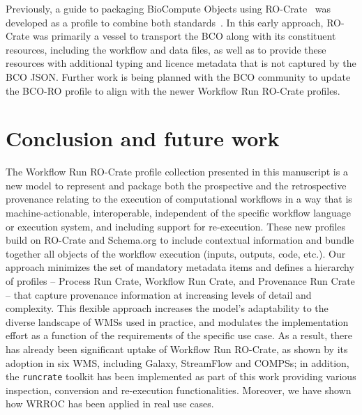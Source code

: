 \documentclass[10pt,letterpaper]{article}
\begin{document}
Previously, a guide to packaging BioCompute Objects using RO-Crate~\cite{bco-roc} was developed as a profile to combine both standards~\cite{Soiland-Reyes 2021}.
In this early approach, RO-Crate was primarily a vessel to transport the BCO along with its constituent resources, including the workflow and data files, as well as to provide these resources with additional typing and licence metadata that is not captured by the BCO JSON.
Further work is being planned with the BCO community to update the BCO-RO profile to align with the newer Workflow Run RO-Crate profiles. 

\hypertarget{conclusion}{%
\section{Conclusion and future work}\label{conclusion}}

The Workflow Run RO-Crate profile collection presented in this manuscript is a
new model to represent and package both the prospective
and the retrospective provenance relating to the execution of computational
workflows in a way that is
machine-actionable, interoperable, independent of the specific workflow language or
execution system, and including support for re-execution.
%
These new profiles build on RO-Crate and Schema.org to include contextual
information and bundle together all objects of the workflow execution
(inputs, outputs, code, etc.).
%
Our approach minimizes the set of mandatory metadata items
and defines a hierarchy of profiles -- Process Run Crate, Workflow Run
Crate, and Provenance Run Crate -- that capture provenance information at increasing
levels of detail and complexity.
This flexible approach increases the model’s adaptability to the diverse
landscape of WMSs used in practice, and modulates the implementation effort as a
function of the requirements of the specific use case.
As a result, there has already been significant uptake of Workflow Run RO-Crate, as shown by its adoption in six WMS, including Galaxy, StreamFlow and COMPSs;
in addition, the \texttt{runcrate} toolkit has been implemented as part of this
work providing various inspection, conversion and re-execution functionalities.
Moreover, we have shown how WRROC has been applied in real use cases.
\end{document}
